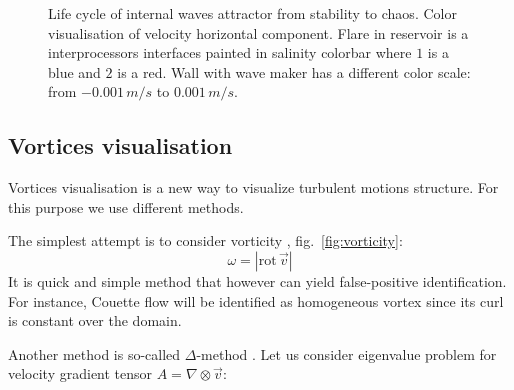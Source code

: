 \documentclass[a4wide,fontsize=12pt]{article}
\begin{document}
\begin{figure}[!Ht]
\centering
    \begin{minipage}{0.45\textwidth}
        \centering
        \label{fig:3DTurbBegin}
    \end{minipage}
    \begin{minipage}{0.45\textwidth}
        \centering
        \label{fig:3DTurbEnd}
    \end{minipage}
    \caption{Life cycle of internal waves attractor from stability to chaos. Color visualisation of velocity horizontal component. Flare in reservoir is a interprocessors interfaces painted in salinity colorbar where $1$ is a blue and $2$ is a red. Wall with wave maker has a different color scale: from $-0.001\,m/s$ to $0.001\,m/s$.}
    \label{fig:3DLocTurbRes}
\end{figure}



\subsection{Vortices visualisation}

Vortices visualisation is a new way to visualize turbulent motions structure. For this purpose we use different methods.

The simplest attempt is to consider vorticity \cite{vortex}, fig.~\ref{fig:vorticity}: $$\omega=|\textrm{rot}\,\vec{v}|$$
It is quick and simple method that however can yield false-positive identification. For instance, Couette flow will be identified as homogeneous vortex since its curl is constant over the domain.

Another method is so-called $\Delta$-method \cite{vortex}. Let us consider eigenvalue problem for velocity gradient tensor $A=\nabla\otimes  \vec v$:

\end{document}
